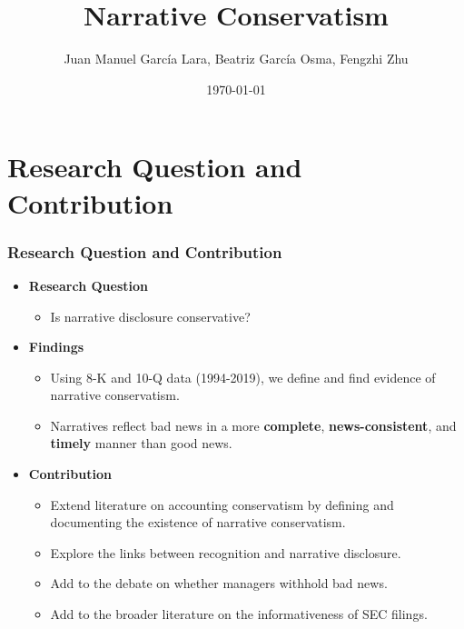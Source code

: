 \documentclass{beamer}
\title[Narrative Conservatism]{Narrative Conservatism} %
\author[]{Juan Manuel Garc\'ia Lara, Beatriz Garc\'ia Osma, Fengzhi Zhu} %
\institute[] %
{\textit{\textit{Universidad Carlos III de Madrid}} \\ %

	\bigskip
	
\medskip
\large Queen Mary University of London

} %
\date{\today} %
\begin{document}
	
\begin{frame}
\titlepage %
\end{frame}


\section{Research Question and Contribution}

\begin{frame}
\frametitle{Research Question and Contribution}
\begin{itemize}
\item \textbf{Research Question}

\begin{itemize}
\item Is narrative disclosure conservative?

\end{itemize}

\medskip
\pause

\item \textbf{Findings}
\begin{itemize}
\item Using 8-K and 10-Q data (1994-2019), we define and find evidence of narrative conservatism. 
\item Narratives reflect bad news in a more \textbf{complete}, \textbf{news-consistent}, and \textbf{timely} manner than good news.
\end{itemize}

\medskip

\pause

\item \textbf{Contribution}

\begin{itemize}
	\item Extend literature on accounting conservatism by defining and documenting the existence of narrative conservatism.
	\item Explore the links between recognition and narrative disclosure.
	\item Add to the debate on whether managers withhold bad news. 
	\item Add to the broader literature on the informativeness of SEC filings.
\end{itemize}
\end{itemize}
\end{frame}
\end{document}
